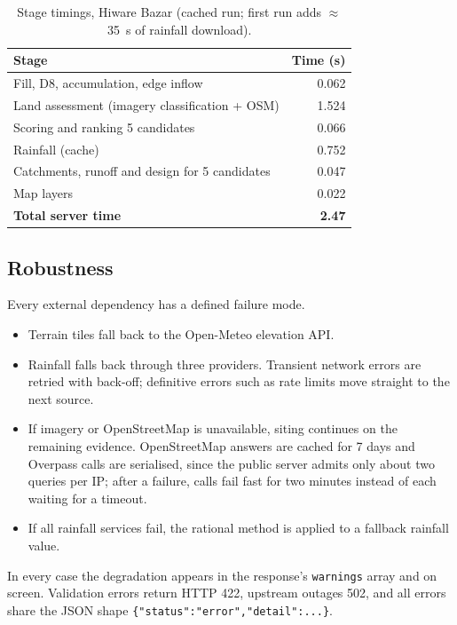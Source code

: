 \documentclass[11pt,a4paper]{article}
\newcommand{\code}[1]{\texttt{\small #1}}
\begin{document}
\begin{table}[H]
\centering\small
\caption{Stage timings, Hiware Bazar (cached run; first run adds $\approx$\SI{35}{s} of rainfall download).}
\label{tab:timing}
\begin{tabular}{@{}lr@{}}
\toprule
Stage & Time (s)\\
\midrule
Fill, D8, accumulation, edge inflow & 0.062\\
Land assessment (imagery classification + OSM) & 1.524\\
Scoring and ranking 5 candidates & 0.066\\
Rainfall (cache) & 0.752\\
Catchments, runoff and design for 5 candidates & 0.047\\
Map layers & 0.022\\
\midrule
\textbf{Total server time} & \textbf{2.47}\\
\bottomrule
\end{tabular}
\end{table}

\subsection{Robustness}
Every external dependency has a defined failure mode.
\begin{itemize}
  \item Terrain tiles fall back to the Open-Meteo elevation API.
  \item Rainfall falls back through three providers. Transient network errors are retried with
        back-off; definitive errors such as rate limits move straight to the next source.
  \item If imagery or OpenStreetMap is unavailable, siting continues on the remaining evidence.
        OpenStreetMap answers are cached for 7 days and Overpass calls are serialised, since
        the public server admits only about two queries per IP; after a failure, calls fail
        fast for two minutes instead of each waiting for a timeout.
  \item If all rainfall services fail, the rational method is applied to a fallback rainfall
        value.
\end{itemize}
In every case the degradation appears in the response's \code{warnings} array and on screen.
Validation errors return HTTP 422, upstream outages 502, and all errors share the JSON shape
\code{\{"status":"error","detail":...\}}.
\end{document}
